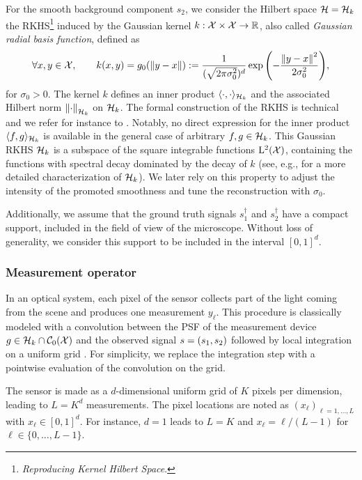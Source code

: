 \documentclass[12pt]{article}
\begin{document}
            For the smooth background component $s_2$, we consider the Hilbert space $\mathcal{H} = \mathcal{H}_k$ the RKHS\footnote{\emph{Reproducing Kernel Hilbert Space}.} induced by the Gaussian kernel $k: \mathcal{X} \times \mathcal{X} \to \mathbb{R}$, also called \emph{Gaussian radial basis function}, defined as
            \begin{equation*}
                \forall x, y \in \mathcal{X}, \qquad k(x, y) = g_0(\left\lVert y - x\right\rVert) := \frac{1}{(\sqrt{2\pi\sigma_0^2})^d} \exp{ \left({-\frac{\left\lVert y - x\right\rVert^2}{2 \sigma_0^2}}\right)},
            \end{equation*}
            for $\sigma_0 > 0$. The kernel $k$ defines an inner product $\langle \cdot, \cdot \rangle_{\mathcal{H}_k}$ and the associated Hilbert norm $\left\lVert\cdot\right\rVert_{\mathcal{H}_k}$ on $\mathcal{H}_k$. The formal construction of the RKHS is technical and we refer for instance to \cite[Chapter~10]{wendland2004}. Notably, no direct expression for the inner product  $\langle f, g \rangle_{\mathcal{H}_k}$ is available in the general case of arbitrary $f, g \in \mathcal{H}_k$. This Gaussian RKHS $\mathcal{H}_k$ is a subspace of the square integrable functions $\mathrm{L}^2(\mathcal{X})$, containing the functions with spectral decay dominated by the decay of $k$ (see, e.g., \cite{minh2010} for a more detailed characterization of $\mathcal{H}_k$). We later rely on this property to adjust the intensity of the promoted smoothness and tune the reconstruction with $\sigma_0$.

            Additionally, we assume that the ground truth signals $s_1^\dagger$ and $ s_2^\dagger$ have a compact support, included in the field of view of the microscope. Without loss of generality, we consider this support to be included in the interval $[0, 1]^d$. 


        \subsubsection{Measurement operator}        
            In an optical system, each pixel of the sensor collects part of the light coming from the scene and produces one measurement $y_\ell$. This procedure is classically modeled with a convolution between the PSF of the measurement device $g \in \mathcal{H}_k \cap {\mathcal{C}}_0({\mathcal{X}})$ and the observed signal $s = (s_1, s_2)$ followed by local integration on a uniform grid \cite{denoyelle2019sliding}. For simplicity, we replace the integration step with a pointwise evaluation of the convolution on the grid.
        
            The sensor is made as a $d$-dimensional uniform grid of $K$ pixels per dimension, leading to $L = K^d$ measurements. The pixel locations are noted as $(x_\ell)_{\ell = 1, \dots, L}$ with $x_\ell \in [0, 1]^d$. For instance, $d=1$ leads to $L=K$ and $x_\ell = {\ell}/({L-1})$ for $\ell \in \{0, \dots, L-1\}$.
        
\end{document}
